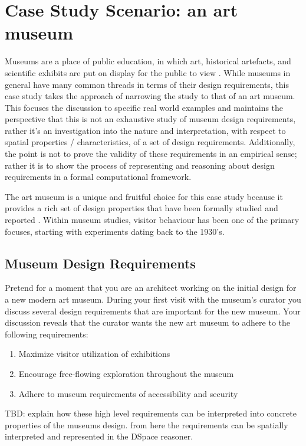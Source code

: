 \documentclass[12pt]{ucthesis}
\begin{document}
\section{Case Study Scenario: an art museum}
Museums are a place of public education, in which art, historical artefacts, and scientific exhibits are put on display for the public to view \cite{Falk}. While museums in general have many common threads in terms of their design requirements, this case study takes the approach of narrowing the study to that of an art museum. This focuses the discussion to specific real world examples and maintains the perspective that this is not an exhaustive study of museum design requirements, rather it's an investigation into the nature and interpretation, with respect to spatial properties / characteristics, of a set of design requirements. Additionally, the point is not to prove the validity of these requirements in an empirical sense; rather it is to show the process of representing and reasoning about design requirements in a formal computational framework.

The art museum is a unique and fruitful choice for this case study because it provides a rich set of design properties that have been formally studied and reported \cite{Melton} \cite{Bitgood02} \cite{Falk}. Within museum studies, visitor behaviour has been one of the primary focuses, starting with experiments dating back to the 1930's. 



\subsection{Museum Design Requirements}
Pretend for a moment that you are an architect working on the initial design for a new modern art museum. During your first visit with the museum's curator you discuss several design requirements that are important for the new museum. Your discussion reveals that the curator wants the new art museum to adhere to the following requirements:

\begin{enumerate}
\item Maximize visitor utilization of exhibitions
\item Encourage free-flowing exploration throughout the museum
\item Adhere to museum requirements of accessibility and security
\end{enumerate}

TBD: explain how these high level requirements can be interpreted into concrete properties of the museums design. from here the requirements can be spatially interpreted and represented in the DSpace reasoner.
\end{document}
